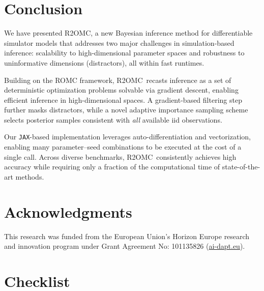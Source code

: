 \documentclass[twoside]{article}
\newcommand{\rromc}{R2OMC}
\begin{document}
\vspace{-1ex}
\section{Conclusion}
\label{sec:conclusion}
\vspace{-1ex}
We have presented \rromc, a new Bayesian inference method for differentiable simulator models that addresses two major challenges in simulation-based inference:
scalability to high-dimensional parameter spaces and robustness to uninformative dimensions (distractors), all within fast runtimes.

Building on the ROMC framework, \rromc~recasts inference as a set of deterministic optimization problems solvable via gradient descent, enabling efficient inference in high-dimensional spaces. 
A gradient-based filtering step further masks distractors, while a novel adaptive importance sampling scheme selects posterior samples consistent with \emph{all} available iid observations.

Our \texttt{JAX}-based implementation leverages auto-differentiation and vectorization, enabling many parameter–seed combinations to be executed at the cost of a single call.
Across diverse benchmarks, \rromc~consistently achieves high accuracy while requiring only a fraction of the computational time of state-of-the-art methods.

\section*{Acknowledgments}

This research was funded from the European Union’s Horizon Europe research and
innovation program under Grant Agreement No: 101135826 (\href{https://www.ai-dapt.eu/}{ai-dapt.eu}).





\section*{Checklist}
\end{document}
